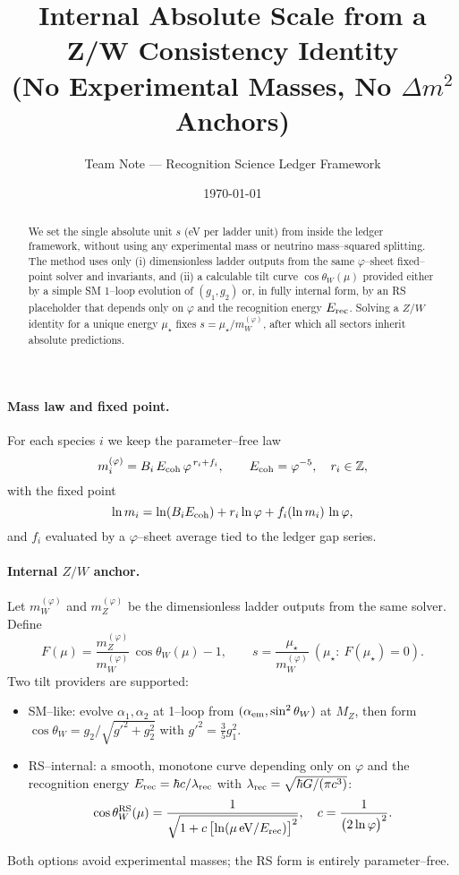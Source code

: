 \documentclass[11pt]{article}
\title{Internal Absolute Scale from a Z/W Consistency Identity\\(No Experimental Masses, No $\Delta m^2$ Anchors)}
\author{Team Note --- Recognition Science Ledger Framework}
\date{\today}
\begin{document}
\maketitle

\begin{abstract}
We set the single absolute unit $s$ (eV per ladder unit) from inside the ledger framework, without using any experimental mass or neutrino mass--squared splitting. The method uses only (i) dimensionless ladder outputs from the same $\varphi$--sheet fixed--point solver and invariants, and (ii) a calculable tilt curve $\cos\theta_W(\mu)$ provided either by a simple SM 1--loop evolution of $(g_1,g_2)$ or, in fully internal form, by an RS placeholder that depends only on $\varphi$ and the recognition energy $E_{\rm rec}$. Solving a $Z/W$ identity for a unique energy $\mu_\star$ fixes $s=\mu_\star/m_W^{(\varphi)}$, after which all sectors inherit absolute predictions.
\end{abstract}

\paragraph{Mass law and fixed point.} For each species $i$ we keep the parameter--free law
\[
  m_i^{(\varphi)} = B_i\,E_{\rm coh}\,\varphi^{\,r_i+f_i},\qquad E_{\rm coh}=\varphi^{-5},\quad r_i\in\mathbb{Z},
\]
with the fixed point
\[
  \ln m_i = \ln(B_i E_{\rm coh}) + r_i\ln\varphi + f_i(\ln m_i)\,\ln\varphi,
\]
and $f_i$ evaluated by a $\varphi$--sheet average tied to the ledger gap series.

\paragraph{Internal $Z/W$ anchor.} Let $m_W^{(\varphi)}$ and $m_Z^{(\varphi)}$ be the dimensionless ladder outputs from the same solver. Define
\[
  F(\mu) = \frac{m_Z^{(\varphi)}}{m_W^{(\varphi)}}\,\cos\theta_W(\mu) - 1,\qquad
  s = \frac{\mu_\star}{m_W^{(\varphi)}}\ (\mu_\star:\ F(\mu_\star)=0).
\]
Two tilt providers are supported:
\begin{itemize}
  \item SM--like: evolve $\alpha_1,\alpha_2$ at 1--loop from $(\alpha_{\rm em},\sin^2\theta_W)$ at $M_Z$, then form $\cos\theta_W = g_2/\sqrt{g'^2+g_2^2}$ with $g'^2=\tfrac{3}{5}g_1^2$.
  \item RS--internal: a smooth, monotone curve depending only on $\varphi$ and the recognition energy $E_{\rm rec}=\hbar c/\lambda_{\rm rec}$ with $\lambda_{\rm rec}=\sqrt{\hbar G/(\pi c^3)}$:
  \[
    \cos\theta_W^{\rm RS}(\mu) = \frac{1}{\sqrt{1 + c\,\bigl[\ln(\mu\,\mathrm{eV}/E_{\rm rec})\bigr]^2}},\quad c=\frac{1}{\bigl(2\ln\varphi\bigr)^2}.
  \]
\end{itemize}
Both options avoid experimental masses; the RS form is entirely parameter--free.
\end{document}
